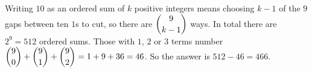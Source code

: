 Writing $10$ as an ordered sum of $k$ positive integers means choosing $k-1$ of the $9$ gaps between ten $1$s to cut, so there are $\dbinom{9}{k-1}$ ways. In total there are $2^9=512$ ordered sums. Those with $1$, $2$ or $3$ terms number $\dbinom90+\dbinom91+\dbinom92=1+9+36=46$. So the answer is $512-46=\boxed{466}$.
